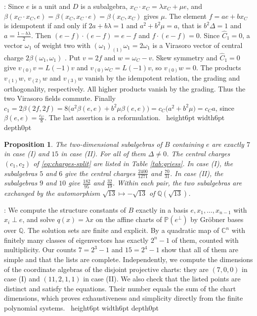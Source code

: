 \documentclass[leqno]{article}
\newcommand{\Cbb}{\ensuremath{\mathbb{C}}}
\newcommand{\qed}{\hfill \vrule height6pt  width6pt depth0pt}
\newtheorem{prop}[thm]{Proposition}
\newenvironment{proof}[1][]{\noindent {\it Proof #1} : }{\hbox{~}\qed
\smallskip
}
\numberwithin{equation}{section}
\begin{document}
\begin{proof}
Since $e$ is a unit and $D$ is a subalgebra, $x_C \cdot x_C = \lambda x_C+\mu e$, and $\beta(x_C \cdot x_C,e) = \beta(x_C,x_C \cdot e) = \beta(x_C,x_C)$ gives $\mu$. The element $f = ae+bx_C$ is idempotent if and only if $2a+b\lambda = 1$ and $a^2+b^2\mu = a$, that is $b^2\Delta = 1$ and $a = \frac{1-b\lambda}{2}$. Then $(e-f)\cdot(e-f) = e-f$ and $f \cdot (e-f) = 0$. Since $\widehat C_1 = 0$, a vector $\omega_1$ of weight two with $(\omega_1)_{(1)}\omega_1 = 2\omega_1$ is a Virasoro vector of central charge $2\beta(\omega_1,\omega_1)$ \cite{Mi96}. Put $v = 2f$ and $w = \omega_C-v$. Skew symmetry and $\widehat C_1 = 0$ give $v_{(0)}v = L(-1)v$ and $v_{(0)}\omega_C = L(-1)v$, so $v_{(0)}w = 0$. The products $v_{(1)}w$, $v_{(2)}w$ and $v_{(3)}w$ vanish by the idempotent relation, the grading and orthogonality, respectively. All higher products vanish by the grading. Thus the two Virasoro fields commute. Finally $c_1 = 2\beta(2f,2f) = 8\big(a^2\beta(e,e)+b^2\mu\beta(e,e)\big) = c_C\big(a^2+b^2\mu\big) = c_Ca$, since $\beta(e,e) = \frac{c_C}{8}$. The last assertion is a reformulation.
\end{proof}

\begin{prop}
\label{prop:griess-candidates}
The two-dimensional subalgebras of $B$ containing $e$ are exactly $7$ in case (I) and $15$ in case (II). For all of them $\Delta \neq 0$. The central charges $(c_1,c_2)$ of \eqref{eq:charges-split} are listed in Table \ref{tab:griess}. In case (I), the subalgebras $5$ and $6$ give the central charges $\frac{2400}{1271}$ and $\frac{70}{31}$. In case (II), the subalgebras $9$ and $10$ give $\frac{182}{95}$ and $\frac{32}{19}$. Within each pair, the two subalgebras are exchanged by the automorphism $\sqrt{13} \mapsto -\sqrt{13}$ of $\mathbb{Q}(\sqrt{13})$.
\end{prop}

\begin{proof}
We compute the structure constants of $B$ exactly in a basis $e,x_1,\ldots,x_{n-1}$ with $x_i \perp e$, and solve $q(x) = \lambda x$ on the affine charts of $\mathbb P(e^\perp)$ by Gröbner bases over $\mathbb{Q}$. The solution sets are finite and explicit. By \cite[Theorem 1.2 p.~2]{CaS13} a quadratic map of $\Cbb^n$ with finitely many classes of eigenvectors has exactly $2^n-1$ of them, counted with multiplicity. Our counts $7 = 2^3-1$ and $15 = 2^4-1$ show that all of them are simple and that the lists are complete. Independently, we compute the dimensions of the coordinate algebras of the disjoint projective charts: they are $(7,0,0)$ in case (I) and $(11,2,1,1)$ in case (II). We also check that the listed points are distinct and satisfy the equations. Their number equals the sum of the chart dimensions, which proves exhaustiveness and simplicity directly from the finite polynomial systems.
\end{proof}
\end{document}
